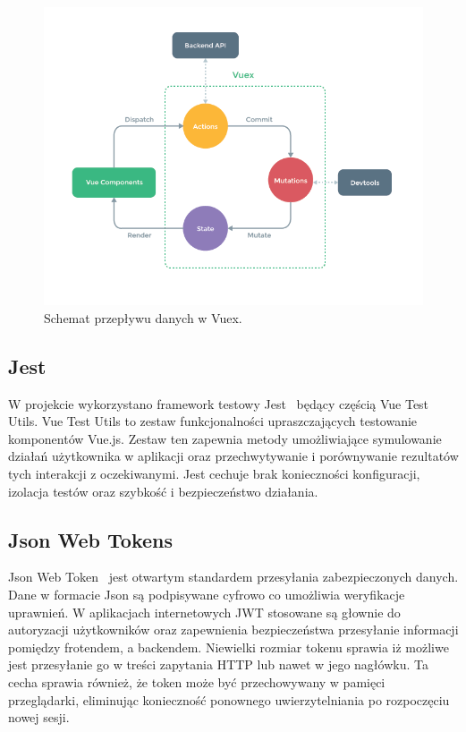 \begin{figure}[t]
\centering\includegraphics[width=\textwidth]{figures/vuex}
\caption{Schemat przepływu danych w Vuex.}\label{rys:vuex}
\end{figure}

\subsection{Jest}
W projekcie wykorzystano framework testowy Jest~\cite{jest} będący częścią Vue Test Utils. Vue Test Utils to zestaw funkcjonalności upraszczających testowanie komponentów Vue.js. Zestaw ten zapewnia metody umożliwiające symulowanie działań użytkownika w aplikacji oraz przechwytywanie i porównywanie rezultatów tych interakcji z oczekiwanymi. Jest cechuje brak konieczności konfiguracji, izolacja testów oraz szybkość i bezpieczeństwo działania.
\subsection{Json Web Tokens}
Json Web Token~\cite{jwt} jest otwartym standardem przesyłania zabezpieczonych danych. Dane w formacie Json są podpisywane cyfrowo co umożliwia weryfikacje uprawnień. W aplikacjach internetowych JWT stosowane są głownie do autoryzacji użytkowników oraz zapewnienia bezpieczeństwa przesyłanie informacji pomiędzy frotendem, a backendem. Niewielki rozmiar tokenu sprawia iż możliwe jest przesyłanie go w treści zapytania HTTP lub nawet w jego nagłówku. Ta cecha sprawia również, że token może być przechowywany w pamięci przeglądarki, eliminując konieczność ponownego uwierzytelniania po rozpoczęciu nowej sesji.
